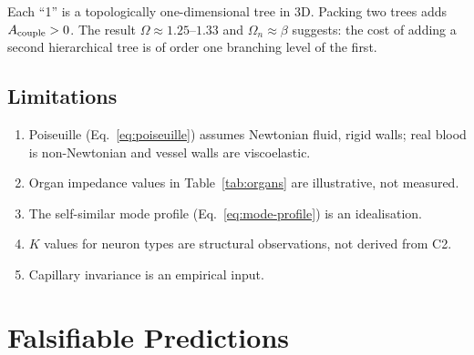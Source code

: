 \documentclass[aps,pre,twocolumn,superscriptaddress,floatfix]{revtex4-2}
\begin{document}
Each ``1'' is a topologically one-dimensional tree in
3D.
Packing two trees adds $A_{\text{couple}} > 0$.
The result $\Omega \approx 1.25$--$1.33$ and
$\Omega_n \approx \beta$ suggests:
the cost of adding a second hierarchical tree is of
order one branching level of the first.

\subsection{Limitations}

\begin{enumerate}
  \item Poiseuille (Eq.~\ref{eq:poiseuille}) assumes
    Newtonian fluid, rigid walls; real blood is
    non-Newtonian and vessel walls are viscoelastic.
  \item Organ impedance values in Table~\ref{tab:organs}
    are illustrative, not measured.
  \item The self-similar mode profile
    (Eq.~\ref{eq:mode-profile}) is an idealisation.
  \item $K$ values for neuron types are structural
    observations, not derived from C2.
  \item Capillary invariance is an empirical input.
\end{enumerate}


\section{Falsifiable Predictions}
\label{sec:predictions}
\end{document}
